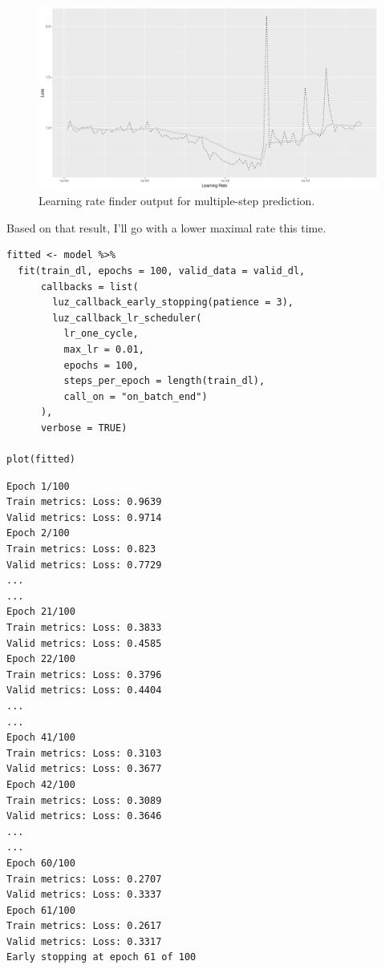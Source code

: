 \documentclass[
  letterpaper,
]{krantz}
\begin{document}
\begin{figure}[H]

{\centering \includegraphics{images/timeseries-vic-elec-lr-finder-mlp.png}

}

\caption{\label{fig-vic-elec-lr-finder-mlp}Learning rate finder output
for multiple-step prediction.}

\end{figure}

Based on that result, I'll go with a lower maximal rate this time.

\begin{verbatim}
fitted <- model %>%
  fit(train_dl, epochs = 100, valid_data = valid_dl,
      callbacks = list(
        luz_callback_early_stopping(patience = 3),
        luz_callback_lr_scheduler(
          lr_one_cycle,
          max_lr = 0.01,
          epochs = 100,
          steps_per_epoch = length(train_dl),
          call_on = "on_batch_end")
      ),
      verbose = TRUE)

plot(fitted)
\end{verbatim}

\begin{verbatim}
Epoch 1/100
Train metrics: Loss: 0.9639                             
Valid metrics: Loss: 0.9714
Epoch 2/100
Train metrics: Loss: 0.823                              
Valid metrics: Loss: 0.7729
...
...
Epoch 21/100
Train metrics: Loss: 0.3833                             
Valid metrics: Loss: 0.4585
Epoch 22/100
Train metrics: Loss: 0.3796                             
Valid metrics: Loss: 0.4404
...
...
Epoch 41/100
Train metrics: Loss: 0.3103                             
Valid metrics: Loss: 0.3677
Epoch 42/100
Train metrics: Loss: 0.3089                             
Valid metrics: Loss: 0.3646
...
...
Epoch 60/100
Train metrics: Loss: 0.2707                             
Valid metrics: Loss: 0.3337
Epoch 61/100
Train metrics: Loss: 0.2617                             
Valid metrics: Loss: 0.3317
Early stopping at epoch 61 of 100
\end{verbatim}
\end{document}
